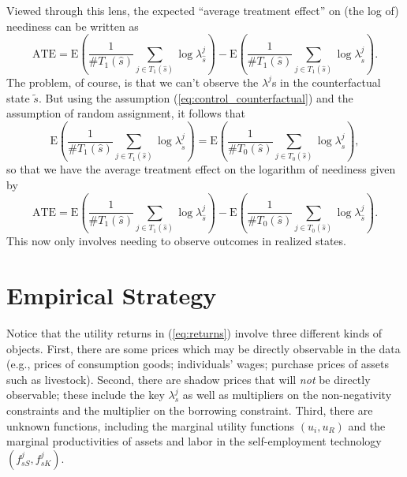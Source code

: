 \documentclass[12pt,letterpaper]{article}
\newcommand{\E}{\ensuremath{\mbox{E}}}
\newcommand{\Eq}[1]{(\ref{eq:#1})}
\begin{document}
Viewed through this lens, the expected ``average treatment effect''
on (the log of) neediness can be written as
\[
   \mbox{ATE}=\E\left(\frac{1}{\#T_1(\hat s)}\sum_{j\in T_1(\hat s)}\log\lambda^j_{\hat s}\right) - \E\left(\frac{1}{\#T_1(\hat s)}\sum_{j\in T_1(\hat s)}\log\lambda^j_{\tilde s} \right).
\]
The problem, of course, is that we can't observe the \(\lambda^j\)s in
the counterfactual state \(\tilde s\).  But using the assumption
\Eq{control_counterfactual} and the assumption of random assignment,
it follows that 
\[
   \E\left(\frac{1}{\#T_1(\hat s)}\sum_{j\in T_1(\hat
       s)}\log\lambda^j_{\tilde s} \right)=\E\left(\frac{1}{\#T_0(\hat
       s)}\sum_{j\in T_0(\hat s)}\log\lambda^j_{\hat s} \right), 
\]
so that we have the average treatment effect on the logarithm of
neediness given by 
\begin{equation}
\label{eq:ate}
    \mbox{ATE}=\E\left(\frac{1}{\#T_1(\hat s)}\sum_{j\in T_1(\hat s)}\log\lambda^j_{\hat s}\right) - \E\left(\frac{1}{\#T_0(\hat s)}\sum_{j\in T_0(\hat s)}\log\lambda^j_{\hat s} \right).
\end{equation}
This now only involves needing to observe outcomes in realized states.


\section{Empirical Strategy}
\label{sec:orgheadline12}

Notice that the utility returns in \Eq{returns} involve three
different kinds of objects.  First, there are some prices which may be
directly observable in the data (e.g., prices of consumption goods;
individuals' wages; purchase prices of assets such as livestock).
Second, there are shadow prices that will \emph{not} be directly
observable; these include the key \(\lambda^j_s\) as well as multipliers
on the non-negativity constraints and the multiplier on the borrowing
constraint.  Third, there are unknown functions, including the
marginal utility functions \((u_i,u_R)\) and the marginal productivities
of assets and labor in the self-employment technology
\((f^j_{sS},f^j_{sK})\).
\end{document}

